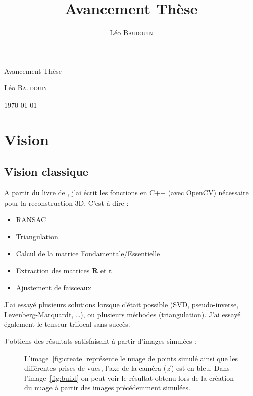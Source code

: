 \documentclass[10pt]{article}
\author{Léo \textsc{Baudouin}}
\title{Avancement Thèse}
\begin{document}
\begin{center}
\begin{Huge}
Avancement Thèse
\end{Huge}

\vspace{3mm}
\begin{Large}
Léo \textsc{Baudouin}
\end{Large}

\vspace{3mm}
\today
\end{center}


\section{Vision}
\subsection{Vision classique}

A partir du livre de \citeauthor{Hartley03Book} , j'ai écrit les fonctions en C++ (avec OpenCV) nécessaire pour la reconstruction 3D.
C'est à dire : 
\begin{itemize}
\item RANSAC
\item Triangulation
\item Calcul de la matrice Fondamentale/Essentielle
\item Extraction des matrices $\mathbf{R}$ et $\mathbf{t}$
\item Ajustement de faisceaux
\end{itemize}
J'ai essayé plusieurs solutions lorsque c'était possible (SVD, pseudo-inverse, Levenberg-Marquardt, \dots), ou plusieurs méthodes (triangulation).
J'ai essayé également le tenseur trifocal sans succès.

J'obtiens des résultats satisfaisant à partir d'images simulées :
\begin{figure}[ht]
\begin{center}
\caption{L'image~\ref{fig:create} représente le nuage de points simulé ainsi que les différentes prises de vues, l'axe de la caméra ($\vec{z}$) est en bleu. Dans l'image~\ref{fig:build} on peut voir le résultat obtenu lors de la création du nuage à partir des images précédemment simulées.}
\end{center}
\end{figure}
\end{document}
